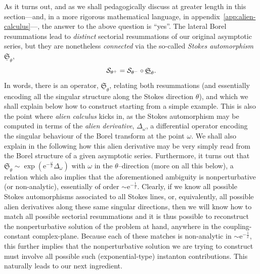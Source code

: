 \documentclass[11pt,a4paper]{article}
\newcommand{\CS}{{\cal S}}
\newcommand{\be}{\begin{equation}}
\newcommand{\ee}{\end{equation}}
\newcommand{\rme}{{\mathrm{e}}}
\begin{document}
As it turns out, and as we shall pedagogically discuss at greater length in this section---and, in a more rigorous mathematical language, in appendix~\ref{app:alien-calculus}---, the answer to the above question is ``yes''. The lateral Borel resummations lead to \textit{distinct} sectorial resummations of our original asymptotic series, but they are nonetheless \textit{connected} via the so-called \textit{Stokes automorphism} $\underline{\mathfrak{S}}_\theta$,
%
\be\label{stokesauto}
\CS_{\theta^+} = \CS_{\theta^-} \circ \underline{\mathfrak{S}}_\theta.
\ee
%
\noindent
In words, there is an operator, $\underline{\mathfrak{S}}_\theta$, relating both resummations (and essentially encoding all the singular structure along the Stokes direction $\theta$), and which we shall explain below how to construct starting from a simple example. This is also the point where \textit{alien calculus} kicks in, as the Stokes automorphism may be computed in terms of the \textit{alien derivative}, $\Delta_\omega$, a differential operator encoding the singular behaviour of the Borel transform at the point $\omega$. We shall also explain in the following how this alien derivative may be very simply read from the Borel structure of a given asymptotic series. Furthermore, it turns out that $\underline{\mathfrak{S}}_\theta \sim \exp \left( \rme^{-\frac{\omega}{x}} \Delta_\omega \right)$ with $\omega$ in the $\theta$--direction (more on all this below), a relation which also implies that the aforementioned ambiguity is nonperturbative (or non-analytic), essentially of order $\sim \rme^{-\frac{1}{x}}$. Clearly, if we know all possible Stokes automorphisms associated to all Stokes lines, or, equivalently, all possible alien derivatives along these same singular directions, then we will know how to match all possible sectorial resummations and it is thus possible to reconstruct the nonperturbative solution of the problem at hand, anywhere in the coupling-constant complex-plane. Because each of these matches is non-analytic in $\sim \rme^{-\frac{1}{x}}$, this further implies that the nonperturbative solution we are trying to construct must involve all possible such (exponential-type) instanton contributions. This naturally leads to our next ingredient. 
\end{document}
